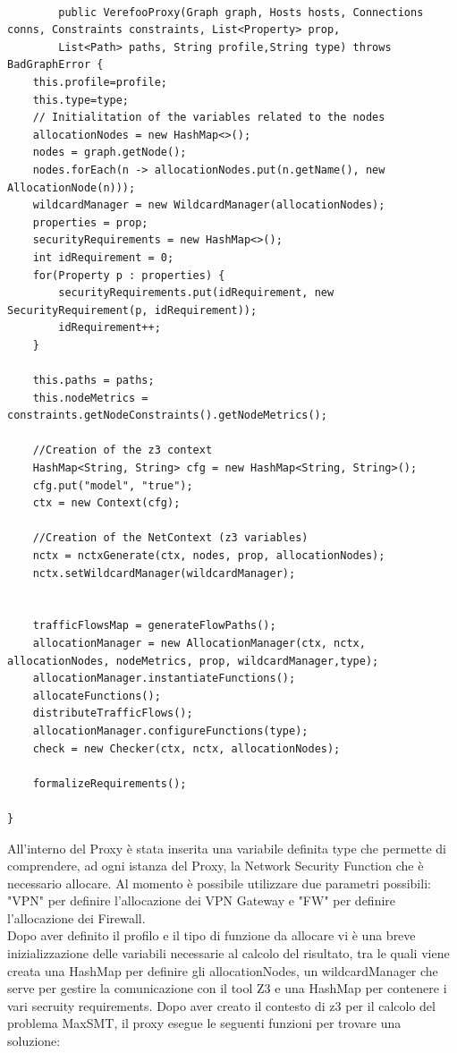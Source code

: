     \begin{lstlisting}[caption={Esempio di codice Java}, label=lst:java_example5]
 
        public VerefooProxy(Graph graph, Hosts hosts, Connections conns, Constraints constraints, List<Property> prop,
        List<Path> paths, String profile,String type) throws BadGraphError {
    this.profile=profile;
    this.type=type;
    // Initialitation of the variables related to the nodes
    allocationNodes = new HashMap<>();
    nodes = graph.getNode();
    nodes.forEach(n -> allocationNodes.put(n.getName(), new AllocationNode(n)));
    wildcardManager = new WildcardManager(allocationNodes);
    properties = prop;
    securityRequirements = new HashMap<>();
    int idRequirement = 0;
    for(Property p : properties) {
        securityRequirements.put(idRequirement, new SecurityRequirement(p, idRequirement));
        idRequirement++;
    }
    
    this.paths = paths;
    this.nodeMetrics = constraints.getNodeConstraints().getNodeMetrics();
    
    //Creation of the z3 context
    HashMap<String, String> cfg = new HashMap<String, String>();
    cfg.put("model", "true");
    ctx = new Context(cfg);
            
    //Creation of the NetContext (z3 variables)
    nctx = nctxGenerate(ctx, nodes, prop, allocationNodes);
    nctx.setWildcardManager(wildcardManager);


    trafficFlowsMap = generateFlowPaths();
    allocationManager = new AllocationManager(ctx, nctx, allocationNodes, nodeMetrics, prop, wildcardManager,type);
    allocationManager.instantiateFunctions();
    allocateFunctions();
    distributeTrafficFlows();
    allocationManager.configureFunctions(type);
    check = new Checker(ctx, nctx, allocationNodes);

    formalizeRequirements();
    
}
\end{lstlisting}

All'interno del Proxy è stata inserita una variabile definita type che permette di comprendere, ad ogni istanza del Proxy, la Network Security Function che è necessario allocare. Al momento
è possibile utilizzare due parametri possibili: "VPN" per definire l'allocazione dei VPN Gateway e "FW" per definire l'allocazione dei Firewall.\\
Dopo aver definito il profilo e il tipo di funzione da allocare vi è una breve inizializzazione delle variabili necessarie al calcolo del risultato, tra le quali viene creata
una HashMap per definire gli allocationNodes, un wildcardManager che serve per gestire la comunicazione con il tool Z3 e una HashMap per contenere i vari secruity requirements.
Dopo aver creato il contesto di z3 per il calcolo del problema MaxSMT, il proxy esegue le seguenti funzioni per trovare una soluzione:

